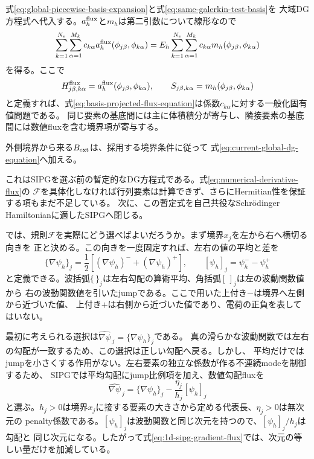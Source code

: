 \documentclass[11pt,a4paper]{article}
\begin{document}
式\eqref{eq:global-piecewise-basis-expansion}と式\eqref{eq:same-galerkin-test-basis}を
大域DG方程式へ代入する。$a_h^{\rm flux}$と$m_h$は第二引数について線形なので
\begin{equation}
 \sum_{k=1}^{N_e}\sum_{\alpha=1}^{M_k}c_{k\alpha}
 a_h^{\rm flux}(\phi_{j\beta},\phi_{k\alpha})
 =E_h\sum_{k=1}^{N_e}\sum_{\alpha=1}^{M_k}c_{k\alpha}
 m_h(\phi_{j\beta},\phi_{k\alpha})
 \label{eq:basis-projected-flux-equation}
\end{equation}
を得る。ここで
\begin{equation}
 H^{\rm flux}_{j\beta,k\alpha}=a_h^{\rm flux}
 (\phi_{j\beta},\phi_{k\alpha}),
 \qquad
 S_{j\beta,k\alpha}=m_h
 (\phi_{j\beta},\phi_{k\alpha})
 \label{eq:provisional-dg-matrix-elements}
\end{equation}
と定義すれば、式\eqref{eq:basis-projected-flux-equation}は係数$c_{k\alpha}$に対する一般化固有値問題である。
同じ要素の基底間には主に体積積分が寄与し、隣接要素の基底間には数値fluxを含む境界項が寄与する。

外側境界から来る$B_{\rm ext}$は、採用する境界条件に従って
式\eqref{eq:current-global-dg-equation}へ加える。

これはSIPGを選ぶ前の暫定的なDG方程式である。式\eqref{eq:numerical-derivative-flux}の
$\mathcal F$を具体化しなければ行列要素は計算できず、さらにHermitian性を保証する項もまだ不足している。
次に、この暫定式を自己共役なSchr\"odinger Hamiltonianに適したSIPGへ閉じる。

では、規則$\mathcal F$を実際にどう選べばよいだろうか。まず境界$x_j$を左から右へ横切る向きを
正と決める。この向きを一度固定すれば、左右の値の平均と差を
\begin{equation}
 \{\nabla\psi_h\}_j=\frac12\left[(\nabla\psi_h)^-+(\nabla\psi_h)^+\right],
 \qquad
 [\psi_h]_j=\psi_h^- -\psi_h^+
 \label{eq:1d-average-jump-for-flux}
\end{equation}
と定義できる。波括弧$\{\,\}_j$は左右勾配の算術平均、角括弧$[\,]_j$は左の波動関数値から
右の波動関数値を引いたjumpである。ここで用いた上付き$-$は境界へ左側から近づいた値、
上付き$+$は右側から近づいた値であり、電荷の正負を表してはいない。

最初に考えられる選択は$\widehat{\nabla\psi}_{\,j}=\{\nabla\psi_h\}_j$である。
真の滑らかな波動関数では左右の勾配が一致するため、この選択は正しい勾配へ戻る。しかし、
平均だけではjumpを小さくする作用がない。左右要素の独立な係数が作る不連続modeを制御するため、
SIPGでは平均勾配にjump比例項を加え、数値勾配fluxを
\begin{equation}
 \boxed{\widehat{\nabla\psi}_{\,j}=\{\nabla\psi_h\}_j-\frac{\eta_j}{h_j}[\psi_h]_j}
 \label{eq:1d-sipg-gradient-flux}
\end{equation}
と選ぶ。$h_j>0$は境界$x_j$に接する要素の大きさから定める代表長、$\eta_j>0$は無次元の
penalty係数である。$[\psi_h]_j$は波動関数と同じ次元を持つので、$[\psi_h]_j/h_j$は勾配と
同じ次元になる。したがって式\eqref{eq:1d-sipg-gradient-flux}では、次元の等しい量だけを加減している。
\end{document}
